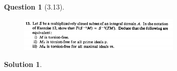 \documentclass[11pt]{article}
\theoremstyle{plain}
\theoremstyle{quest}
\newtheorem*{question}{Question}
\newtheorem*{solution}{Solution}
\begin{document}
\bigskip

\begin{question}[3.13]
\hfill
\begin{figure}[h!]
  \centering
    \includegraphics[width=0.7\textwidth]{d-3-13.png}
\end{figure}
\end{question}
\begin{solution} \hfill \\
\end{solution}
\end{document}
